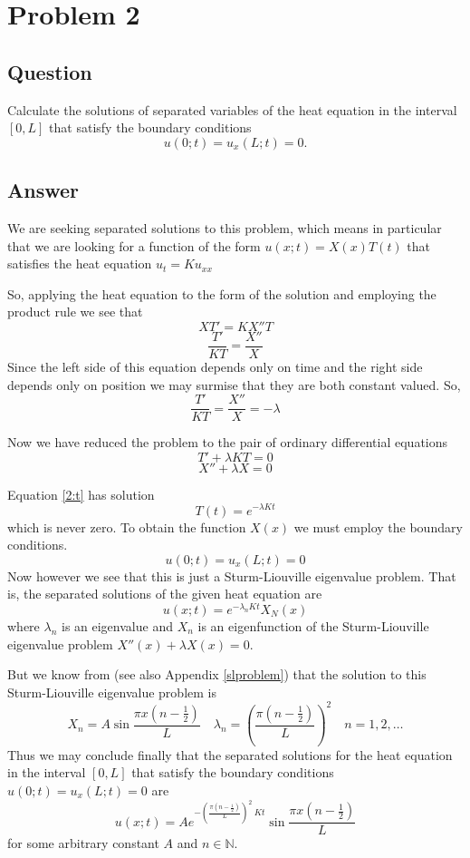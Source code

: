 \documentclass[12pt]{article}
\begin{document}
\section{Problem 2}
\subsection{Question}
Calculate the solutions of separated variables of the heat equation in the interval $[0,L]$ that satisfy the boundary conditions
\[u(0;t)=u_x(L;t)=0.\]

\subsection{Answer}
We are seeking separated solutions to this problem, which means in particular that we are looking for a function of the form $u(x;t)=X(x)T(t)$ that satisfies the heat equation $u_t = K u_{xx}$

So, applying the heat equation to the form of the solution and employing the product rule we see that 
\[XT'=KX''T\]
\[\frac{T'}{KT}=\frac{X''}{X}\]
Since the left side of this equation depends only on time and the right side depends only on position we may surmise that they are both constant valued. So, 
\[\frac{T'}{KT}=\frac{X''}{X}=-\lambda\]

Now we have reduced the problem to the pair of ordinary differential equations
\begin{equation}\label{2:t} T'+\lambda K T = 0 \end{equation}
\begin{equation}\label{2:x} X''+\lambda X = 0 \end{equation}

Equation \ref{2:t} has solution 
\[T(t)=e^{-\lambda K t}\]
which is never zero. To obtain the function $X(x)$ we must employ the boundary conditions.
\[u(0;t)=u_x(L;t)=0\]
Now however we see that this is just a Sturm-Liouville eigenvalue problem. That is, the separated solutions of the given heat equation are 
\[u(x;t)=e^{-\lambda_n K t}X_N(x)\] 
where $\lambda_n$ is an eigenvalue and $X_n$ is an eigenfunction of the Sturm-Liouville eigenvalue problem  $X''(x)+\lambda X(x) = 0$. 

But we know from \cite[Exercise 1 Page 96]{pinsky} (see also Appendix \ref{slproblem}) that the solution to this Sturm-Liouville eigenvalue problem is 
\[X_n= A \sin{\frac{\pi x(n-\frac{1}{2})}{L}} \quad \lambda_n=\left( \frac{\pi (n-\frac{1}{2})}{L} \right)^2 \quad n=1,2,\dots \]
Thus we may conclude finally that the separated solutions for the heat equation in the interval $[0,L]$ that satisfy the boundary conditions $u(0;t)=u_x(L;t)=0$ are
\[u(x;t)=A e^{- \left( \frac{\pi (n-\frac{1}{2})}{L} \right)^2 \ K t} \sin{\frac{\pi x(n-\frac{1}{2})}{L}} \] 
for some arbitrary constant $A$ and $n \in \mathbb{N}$.
\end{document}
